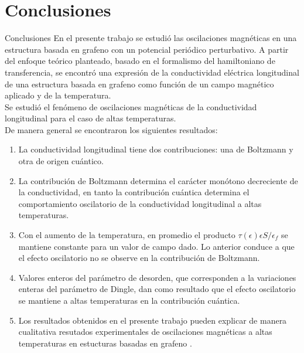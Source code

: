 
	\section{Conclusiones}
		\justifying
		\begin{frame}{Conclusiones}
			En el presente trabajo se estudió las oscilaciones magnéticas en una estructura basada en grafeno
			con un potencial periódico perturbativo. A partir del enfoque teórico planteado, basado en el
			formalismo del hamiltoniano de transferencia, se encontró una expresión de la conductividad eléctrica longitudinal
			de una estructura basada en grafeno como función de un campo magnético aplicado y de la temperatura.\\
			Se estudió el fenómeno de oscilaciones magnéticas de la conductividad longitudinal para el caso de altas temperaturas.\\
			De manera general se encontraron los siguientes resultados:

		\end{frame}

		\begin{frame}
		\footnotesize

		\begin{enumerate}
		 	\item
			La conductividad longitudinal tiene dos contribuciones: una de Boltzmann y otra de origen cuántico.

			\item <2->
			La contribución de Boltzmann determina el carácter monótono decreciente de la conductividad, en tanto la contribución cuántica determina el comportamiento oscilatorio de la conductividad longitudinal a altas temperaturas.

			\item <3->
			Con el aumento de la temperatura, en promedio el producto $\tau(\epsilon)\epsilon S/\epsilon_{f}$ se mantiene constante para un valor de campo dado. Lo anterior conduce a que el efecto oscilatorio no se observe en la contribución de Boltzmann.

			\item <4->
			Valores enteros del parámetro de desorden, que corresponden a la variaciones enteras del parámetro de Dingle, dan como resultado que el efecto oscilatorio se mantiene a altas temperaturas en la contribución cuántica.

			\item <5->
			Los resultados obtenidos en el presente trabajo pueden explicar de manera cualitativa resutados experimentales de oscilaciones magnéticas a altas temperaturas en estucturas basadas en grafeno \cite{Kumar2017}.
		\end{enumerate}

		\end{frame}
